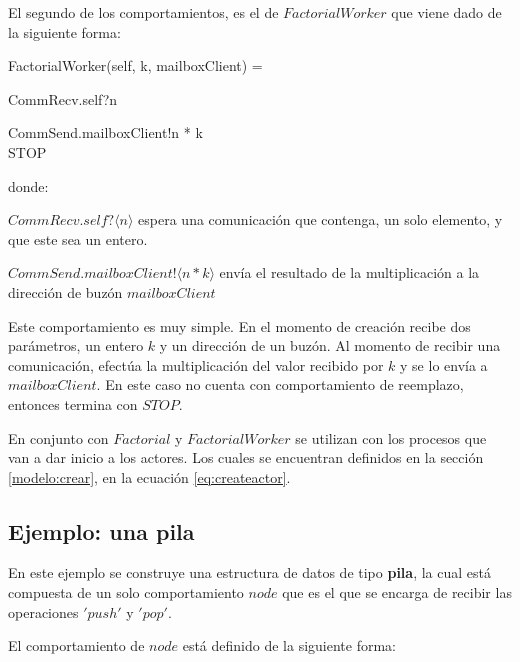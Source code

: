 El segundo de los comportamientos, es el de $FactorialWorker$ que viene dado de la siguiente forma:

\begin{process}
FactorialWorker(self, k, mailboxClient) = {} \\ \quad
  \begin{block}
  CommRecv.self?\langle n \rangle \then {} \\ \quad
    \begin{block}
    CommSend.mailboxClient!\langle n * k \rangle \then \\
    STOP
    \end{block}
  \end{block}
\end{process}
donde:
\begin{description}
 \item $CommRecv.self?\langle n \rangle$ espera una comunicación que contenga, un solo elemento, y que este sea un entero.
 \item $CommSend.mailboxClient!\langle n * k \rangle$ envía el resultado de la multiplicación a la dirección de buzón $mailboxClient$
\end{description}

Este comportamiento es muy simple. En el momento de creación recibe dos parámetros, un entero $k$ y un dirección de un buzón. Al momento de recibir una comunicación, efectúa la multiplicación del valor recibido por $k$ y se lo envía a $mailboxClient$. En este caso no cuenta con comportamiento de reemplazo, entonces termina con $STOP$.

En conjunto con $Factorial$ y $FactorialWorker$ se utilizan con los procesos que van a dar inicio a los actores. Los cuales se encuentran definidos en la sección \ref{modelo:crear},  en la ecuación \eqref{eq:createactor}.

\subsection{Ejemplo: una pila}
En este ejemplo se construye una estructura de datos de tipo \textbf{pila}, la cual está compuesta de un solo comportamiento $node$ que es el que se encarga de recibir las operaciones $'push'$ y $'pop'$.

El comportamiento de $node$ está definido de la siguiente forma:

